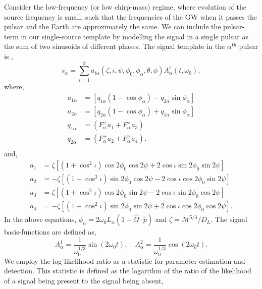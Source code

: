 \documentclass[twocolappendix,tighten]{emulateapj}
\begin{document}
Consider the low-frequency (or low chirp-mass) regime, where evolution of the source frequency is small, such that the frequencies of the GW when it passes the pulsar and the Earth are approximately the same. We can include the pulsar-term in our single-source template by modelling the signal in a single pulsar as the sum of two sinusoids of different phases. The signal template in the $\alpha^{\text{th}}$ pulsar is \citep{ellisoptimal2012},
\begin{equation}\label{eq:non-evolve-template}
s_{\alpha} = \sum_{i=1}^2 a_{i\alpha}(\zeta,\iota,\psi,\phi_0,\phi_{\alpha},\theta,\phi)A^i_{\alpha}(t,\omega_0),
\end{equation}
where,
\begin{align} \label{eq:aialpha}
a_{1\alpha} &= \left[q_{1\alpha}\left(1-\cos\phi_{\alpha}\right)-q_{2\alpha}\sin\phi_{\alpha}\right] \nonumber\\
a_{2\alpha} &= \left[q_{2\alpha}\left(1-\cos\phi_{\alpha}\right)+q_{1\alpha}\sin\phi_{\alpha}\right] \\
q_{1\alpha} &= \left(F^+_{\alpha}a_1+F^{\times}_{\alpha}a_3\right)\nonumber\\
q_{2\alpha} &= \left(F^+_{\alpha}a_2+F^{\times}_{\alpha}a_4\right),\\
\end{align} 
and,
\begin{align}
a_1 &= \zeta\left[\left(1+\cos^2\iota\right)\cos2\phi_0\cos2\psi + 2\cos\iota\sin2\phi_0\sin2\psi\right]  \nonumber\\
a_2 &= -\zeta\left[\left(1+\cos^2\iota\right)\sin2\phi_0\cos2\psi - 2\cos\iota\cos2\phi_0\sin2\psi\right]  \nonumber\\
a_3 &= \zeta\left[\left(1+\cos^2\iota\right)\cos2\phi_0\sin2\psi - 2\cos\iota\sin2\phi_0\cos2\psi\right]  \nonumber\\
a_4 &= -\zeta\left[\left(1+\cos^2\iota\right)\sin2\phi_0\sin2\psi + 2\cos\iota\cos2\phi_0\cos2\psi\right].
\end{align}
In the above equations, $\phi_{\alpha} = 2\omega_0L_{\alpha}(1+\hat\Omega\cdot\hat{p})$ and $\zeta=\mathcal{M}^{5/3}/D_L$. The signal basis-functions are defined as,
\begin{equation}
A^1_{\alpha} = \frac{1}{\omega_0^{1/3}}\sin(2\omega_0 t),\quad A^2_{\alpha} = \frac{1}{\omega_0^{1/3}}\cos(2\omega_0 t).
\end{equation}
We employ the log-likelihood ratio as a statistic for parameter-estimation and detection. This statistic is defined as the logarithm of the ratio of the likelihood of a signal being present to the signal being absent,
\end{document}
